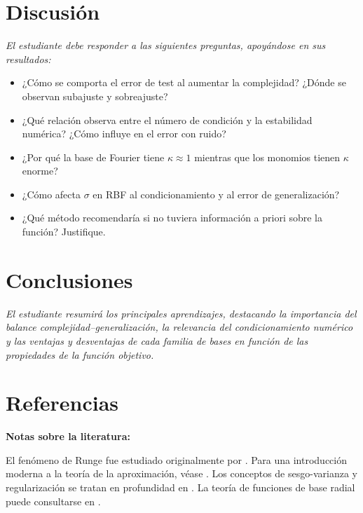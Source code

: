 \section{Discusión}
\textit{El estudiante debe responder a las siguientes preguntas, apoyándose en sus resultados:}
\begin{itemize}
  \item ¿Cómo se comporta el error de test al aumentar la complejidad? ¿Dónde se observan subajuste y sobreajuste?
  \item ¿Qué relación observa entre el número de condición y la estabilidad numérica? ¿Cómo influye en el error con ruido?
  \item ¿Por qué la base de Fourier tiene \(\kappa \approx 1\) mientras que los monomios tienen \(\kappa\) enorme?
  \item ¿Cómo afecta \(\sigma\) en RBF al condicionamiento y al error de generalización?
  \item ¿Qué método recomendaría si no tuviera información a priori sobre la función? Justifique.
\end{itemize}

\section{Conclusiones}
\textit{El estudiante resumirá los principales aprendizajes, destacando la importancia del balance complejidad–generalización, la relevancia del condicionamiento numérico y las ventajas y desventajas de cada familia de bases en función de las propiedades de la función objetivo.}

\section{Referencias}
\begin{notasbib}
  \textbf{Notas sobre la literatura:}
  
  El fenómeno de Runge fue estudiado originalmente por \cite{runge1901}. 
  Para una introducción moderna a la teoría de la aproximación, véase \cite{trefethen2019}. 
  Los conceptos de sesgo-varianza y regularización se tratan en profundidad en \cite{hastie2009}.
  La teoría de funciones de base radial puede consultarse en \cite{buhmann2003}.
\end{notasbib}

\printbibliography[heading=subbibliography]